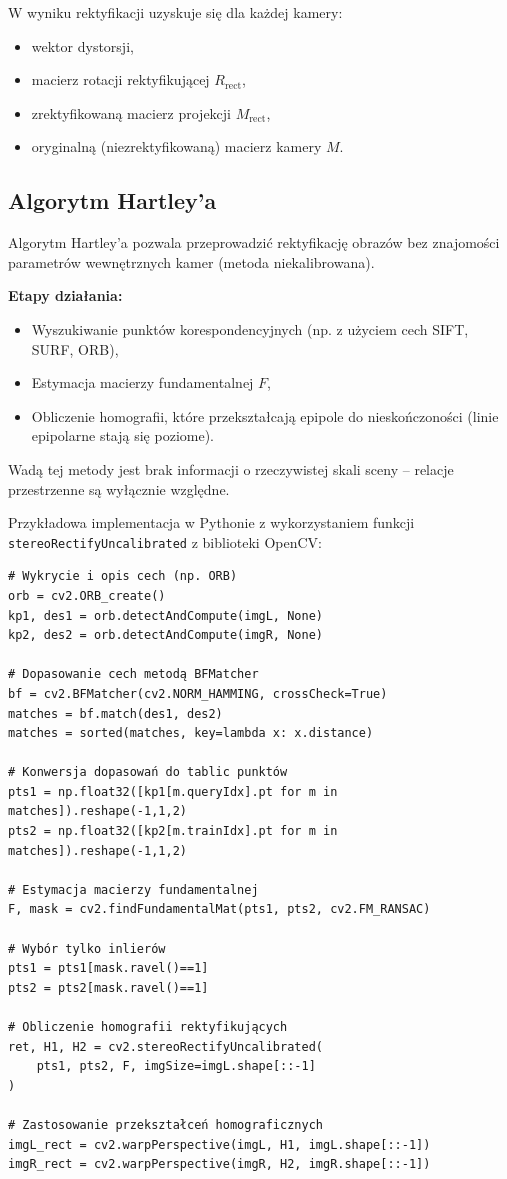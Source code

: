 \documentclass[magisterska]{pracadypl}
\begin{document}
W wyniku rektyfikacji uzyskuje się dla każdej kamery:

\begin{itemize}
    \item wektor dystorsji,
    \item macierz rotacji rektyfikującej $R_{\text{rect}}$,
    \item zrektyfikowaną macierz projekcji $M_{\text{rect}}$,
    \item oryginalną (niezrektyfikowaną) macierz kamery $M$.
\end{itemize}

\subsection*{Algorytm Hartley’a}

Algorytm Hartley’a \cite{hartley} pozwala przeprowadzić rektyfikację obrazów bez znajomości parametrów wewnętrznych kamer (metoda niekalibrowana).

\textbf{Etapy działania:}
\begin{itemize}
    \item Wyszukiwanie punktów korespondencyjnych (np. z użyciem cech SIFT, SURF, ORB),
    \item Estymacja macierzy fundamentalnej $F$,
    \item Obliczenie homografii, które przekształcają epipole do nieskończoności (linie epipolarne stają się poziome).
\end{itemize}

Wadą tej metody jest brak informacji o rzeczywistej skali sceny – relacje przestrzenne są wyłącznie względne.

\noindent Przykładowa implementacja w Pythonie z wykorzystaniem funkcji \texttt{stereoRectifyUncalibrated} z biblioteki OpenCV:

\begin{lstlisting}[style=mypython]
# Wykrycie i opis cech (np. ORB)
orb = cv2.ORB_create()
kp1, des1 = orb.detectAndCompute(imgL, None)
kp2, des2 = orb.detectAndCompute(imgR, None)

# Dopasowanie cech metodą BFMatcher
bf = cv2.BFMatcher(cv2.NORM_HAMMING, crossCheck=True)
matches = bf.match(des1, des2)
matches = sorted(matches, key=lambda x: x.distance)

# Konwersja dopasowań do tablic punktów
pts1 = np.float32([kp1[m.queryIdx].pt for m in matches]).reshape(-1,1,2)
pts2 = np.float32([kp2[m.trainIdx].pt for m in matches]).reshape(-1,1,2)

# Estymacja macierzy fundamentalnej
F, mask = cv2.findFundamentalMat(pts1, pts2, cv2.FM_RANSAC)

# Wybór tylko inlierów
pts1 = pts1[mask.ravel()==1]
pts2 = pts2[mask.ravel()==1]

# Obliczenie homografii rektyfikujących
ret, H1, H2 = cv2.stereoRectifyUncalibrated(
    pts1, pts2, F, imgSize=imgL.shape[::-1]
)

# Zastosowanie przekształceń homograficznych
imgL_rect = cv2.warpPerspective(imgL, H1, imgL.shape[::-1])
imgR_rect = cv2.warpPerspective(imgR, H2, imgR.shape[::-1])
\end{lstlisting}
\end{document}
